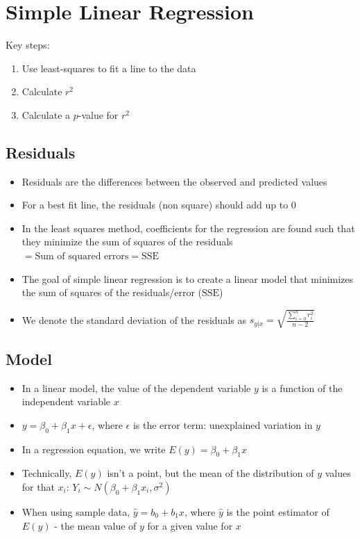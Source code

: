 \documentclass{article}
\begin{document}
\section{Simple Linear Regression}

Key steps:
\begin{enumerate}
    \item Use least-squares to fit a line to the data
    \item Calculate $r^2$
    \item Calculate a $p$-value for $r^2$
\end{enumerate}

\subsection{Residuals}

\begin{itemize}
    \item Residuals are the differences between the observed and predicted values
    \item For a best fit line, the residuals (non square) should add up to 0
    \item In the least squares method, coefficients for the regression are found such that they minimize the sum of squares of the residuals $=\text{Sum of squared errors}=\text{SSE}$
    \item The goal of simple linear regression is to create a linear model that minimizes the sum of squares of the residuals/error ($\text{SSE}$)
    \item We denote the standard deviation of the residuals as $s_{y|x}=\sqrt{\frac{\sum_{i=0}^n r_i^2}{n-2}}$
\end{itemize}

\subsection{Model}

\begin{itemize}
    \item In a linear model, the value of the dependent variable $y$ is a function of the independent variable $x$
    \item $y=\beta_0 + \beta_1 x + \epsilon$, where $\epsilon$ is the error term: unexplained variation in $y$
    \item In a regression equation, we write $E(y)=\beta_0 + \beta_1 x$
    \item Technically, $E(y)$ isn't a point, but the mean of the distribution of $y$ values for that $x_i$: $Y_i \sim N(\beta_0 + \beta_ 1 x_i, \sigma^2)$
    \item When using sample data, $\hat{y}=b_0+b_1 x$, where $\hat{y}$ is the point estimator of $E(y)$ - the mean value of $y$ for a given value for $x$
\end{itemize}
\end{document}
